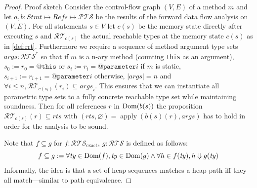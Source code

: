 \begin{proof}{Proof sketch}
Consider the control-flow graph $(V,E)$ of a method $m$ and let $a, b : \mathit{Stmt} \mapsto \mathit{Refs} \mapsto \mathcal{PTS}$ be the results of the forward data flow analysis on $(V,E)$. For all statements $s \in V$ let $c(s)$ be the memory state directly after executing $s$ and $\mathcal{RT}_{c(s)}$ the actual reachable types at the memory state $c(s)$ as in \cref{def:rrt}. Furthermore we require a sequence of method argument type sets $\mathit{args} : \mathcal{RTS}^*$ so that if $m$ is a n-ary method (counting \texttt{this} as an argument), $s_0 := r_0 = \texttt{@this}$ or $s_i :=  r_i = \texttt{@parameter}i$ if $m$ is static, $s_{i+1} := r_{i+1} = \texttt{@parameter}i$ otherwise,  $|\mathit{args}| = n$ and $\forall i \le n, \mathcal{RT}_{c(s_i)}(r_i) \subseteq \mathit{args}_i$. This ensures that we can instantiate all parametric type sets to a fully concrete reachable type set while maintaining soundness.
Then for all references $r$ in $\operatorname{Dom}(b(s))$ the proposition $\mathcal{RT}_{c(s)}(r) \subseteq \mathit{rts}$ with $(rts, \varnothing) = \operatorname{apply}(b(s)(r), \mathit{args})$ has to hold in order for the analysis to be sound.

Note that $f \subseteq g$ for $f : \mathcal{RTS}_\text{exact}$, $g : \mathcal{RTS}$ is defined as follows:
\[ f \subseteq g := \forall \mathit{ty} \in \operatorname{Dom}(f), \mathit{ty} \in \operatorname{Dom}(g) \land \forall h \in f(\mathit{ty}), h \Downarrow g(\mathit{ty}) \]
Informally, the idea is that a set of heap sequences matches a heap path iff they all match---similar to path equivalence.


\end{proof}
